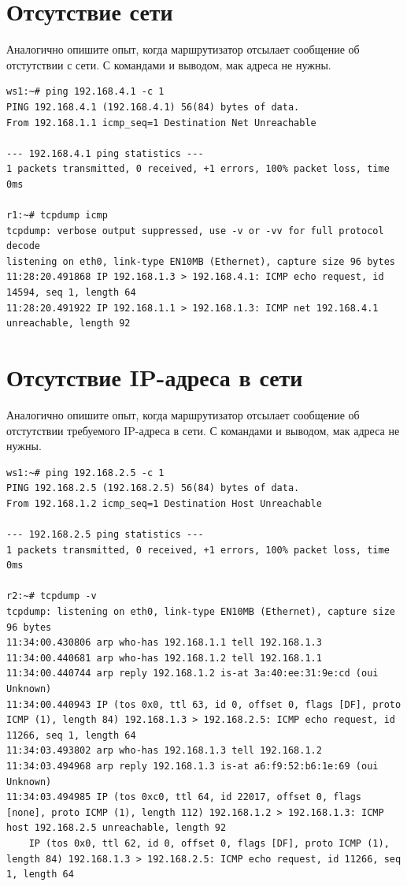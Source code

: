 \documentclass[a4paper,12pt]{article}
\begin{document}
\section{Отсутствие сети}

Аналогично опишите опыт, когда маршрутизатор отсылает сообщение об отстутствии с сети.
С командами и выводом, мак адреса не нужны.
\begin{Verbatim}
ws1:~# ping 192.168.4.1 -c 1
PING 192.168.4.1 (192.168.4.1) 56(84) bytes of data.
From 192.168.1.1 icmp_seq=1 Destination Net Unreachable

--- 192.168.4.1 ping statistics ---
1 packets transmitted, 0 received, +1 errors, 100% packet loss, time 0ms

r1:~# tcpdump icmp
tcpdump: verbose output suppressed, use -v or -vv for full protocol decode
listening on eth0, link-type EN10MB (Ethernet), capture size 96 bytes
11:28:20.491868 IP 192.168.1.3 > 192.168.4.1: ICMP echo request, id 14594, seq 1, length 64
11:28:20.491922 IP 192.168.1.1 > 192.168.1.3: ICMP net 192.168.4.1 unreachable, length 92
\end{Verbatim}

\section{Отсутствие IP-адреса в сети}

Аналогично опишите опыт, когда маршрутизатор отсылает сообщение об отстутствии требуемого IP-адреса в сети.
С командами и выводом, мак адреса не нужны.

\begin{Verbatim}
ws1:~# ping 192.168.2.5 -c 1
PING 192.168.2.5 (192.168.2.5) 56(84) bytes of data.
From 192.168.1.2 icmp_seq=1 Destination Host Unreachable

--- 192.168.2.5 ping statistics ---
1 packets transmitted, 0 received, +1 errors, 100% packet loss, time 0ms

r2:~# tcpdump -v 
tcpdump: listening on eth0, link-type EN10MB (Ethernet), capture size 96 bytes
11:34:00.430806 arp who-has 192.168.1.1 tell 192.168.1.3
11:34:00.440681 arp who-has 192.168.1.2 tell 192.168.1.1
11:34:00.440744 arp reply 192.168.1.2 is-at 3a:40:ee:31:9e:cd (oui Unknown)
11:34:00.440943 IP (tos 0x0, ttl 63, id 0, offset 0, flags [DF], proto ICMP (1), length 84) 192.168.1.3 > 192.168.2.5: ICMP echo request, id 11266, seq 1, length 64
11:34:03.493802 arp who-has 192.168.1.3 tell 192.168.1.2
11:34:03.494968 arp reply 192.168.1.3 is-at a6:f9:52:b6:1e:69 (oui Unknown)
11:34:03.494985 IP (tos 0xc0, ttl 64, id 22017, offset 0, flags [none], proto ICMP (1), length 112) 192.168.1.2 > 192.168.1.3: ICMP host 192.168.2.5 unreachable, length 92
	IP (tos 0x0, ttl 62, id 0, offset 0, flags [DF], proto ICMP (1), length 84) 192.168.1.3 > 192.168.2.5: ICMP echo request, id 11266, seq 1, length 64
\end{Verbatim}
\end{document}
